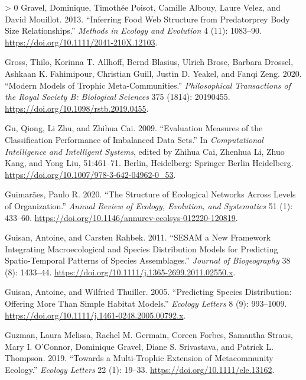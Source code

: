 \documentclass[10pt,oneside]{article}
\newlength{\cslhangindent}
\newenvironment{CSLReferences}[3] %
 {%
  \setlength{\parindent}{0pt}
  \ifodd #1 \everypar{\setlength{\hangindent}{\cslhangindent}}\ignorespaces\fi
  \ifnum #2 > 0
  \setlength{\parskip}{#2\baselineskip}
  \fi
 }%
 {}
\begin{document}
\begin{CSLReferences}{1}{0}
\leavevmode\hypertarget{ref-Gravel2013InfFoo}{}%
Gravel, Dominique, Timothée Poisot, Camille Albouy, Laure Velez, and
David Mouillot. 2013. {``Inferring Food Web Structure from Predatorprey
Body Size Relationships.''} \emph{Methods in Ecology and Evolution} 4
(11): 1083--90. \url{https://doi.org/10.1111/2041-210X.12103}.

\leavevmode\hypertarget{ref-Gross2020ModMod}{}%
Gross, Thilo, Korinna T. Allhoff, Bernd Blasius, Ulrich Brose, Barbara
Drossel, Ashkaan K. Fahimipour, Christian Guill, Justin D. Yeakel, and
Fanqi Zeng. 2020. {``Modern Models of Trophic Meta-Communities.''}
\emph{Philosophical Transactions of the Royal Society B: Biological
Sciences} 375 (1814): 20190455.
\url{https://doi.org/10.1098/rstb.2019.0455}.

\leavevmode\hypertarget{ref-Gu2009EvaMea}{}%
Gu, Qiong, Li Zhu, and Zhihua Cai. 2009. {``Evaluation Measures of the
Classification Performance of Imbalanced Data Sets.''} In
\emph{Computational Intelligence and Intelligent Systems}, edited by
Zhihua Cai, Zhenhua Li, Zhuo Kang, and Yong Liu, 51:461--71. Berlin,
Heidelberg: Springer Berlin Heidelberg.
\url{https://doi.org/10.1007/978-3-642-04962-0_53}.

\leavevmode\hypertarget{ref-Guimaraes2020StrEco}{}%
Guimarães, Paulo R. 2020. {``The Structure of Ecological Networks Across
Levels of Organization.''} \emph{Annual Review of Ecology, Evolution,
and Systematics} 51 (1): 433--60.
\url{https://doi.org/10.1146/annurev-ecolsys-012220-120819}.

\leavevmode\hypertarget{ref-Guisan2011SesNew}{}%
Guisan, Antoine, and Carsten Rahbek. 2011. {``SESAM a New Framework
Integrating Macroecological and Species Distribution Models for
Predicting Spatio-Temporal Patterns of Species Assemblages.''}
\emph{Journal of Biogeography} 38 (8): 1433--44.
\url{https://doi.org/10.1111/j.1365-2699.2011.02550.x}.

\leavevmode\hypertarget{ref-Guisan2005PreSpe}{}%
Guisan, Antoine, and Wilfried Thuiller. 2005. {``Predicting Species
Distribution: Offering More Than Simple Habitat Models.''} \emph{Ecology
Letters} 8 (9): 993--1009.
\url{https://doi.org/10.1111/j.1461-0248.2005.00792.x}.

\leavevmode\hypertarget{ref-Guzman2019MulExt}{}%
Guzman, Laura Melissa, Rachel M. Germain, Coreen Forbes, Samantha
Straus, Mary I. O'Connor, Dominique Gravel, Diane S. Srivastava, and
Patrick L. Thompson. 2019. {``Towards a Multi-Trophic Extension of
Metacommunity Ecology.''} \emph{Ecology Letters} 22 (1): 19--33.
\url{https://doi.org/10.1111/ele.13162}.


\end{CSLReferences}
\end{document}

